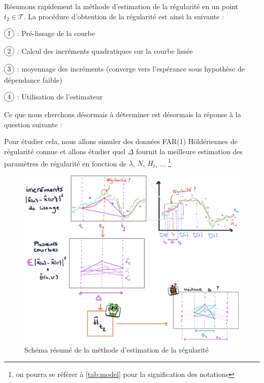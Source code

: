 Résumons rapidement la méthode d'estimation de la régularité en un point $t_2 \in \mathcal T$.
\noindent La procédure d'obtention de la régularité est ainsi la suivante :

$\circled 1$ : Pré-lissage de la courbe

$\circled 2$ : Calcul des incréments quadratiques sur la courbe lissée

$\circled 3$ : moyennage des incréments (converge vers l'espérance sous hypothèse de dépendance faible)

$\circled 4$ : Utilisation de l'estimateur

Ce que nous cherchons désormais à déterminer est désormais la réponse à la question suivante :


Pour étudier cela, nous allons simuler des données FAR(1) Höldériennes de régularité connue et allons étudier quel $\Delta$ fournit la meilleure estimation des paramètres de régularité en fonction de $\lambda$, $N$, $H_t$, ... \footnote{on pourra se référer à \ref{tab:model} pour la signification des notations}

\begin{figure}[H]
	\begin{center}
		\includegraphics[width=\textwidth]{Images/sketches/estim_reg.jpg}
	\end{center}

	\caption{Schéma résumé de la méthode d'estimation de la régularité}
	\label{fig:sketch_estim_reg_methodo}
\end{figure}

